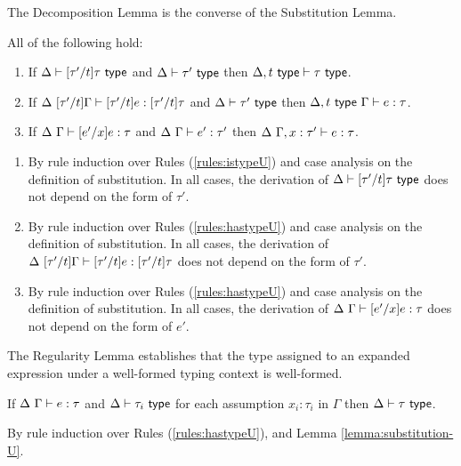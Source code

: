The Decomposition Lemma is the converse of the Substitution Lemma.
\begin{lemma}[Decomposition]\label{lemma:decomposition-U} All of the following hold:
\begin{enumerate}
\item If $\Delta \vdash [\tau'/t]\tau~\mathsf{type}$ and $\Delta \vdash \tau'~\mathsf{type}$ then $\Delta, t~\mathsf{type} \vdash \tau~\mathsf{type}$.
\item If $\Delta~[\tau'/t]\Gamma \vdash [\tau'/t]e : [\tau'/t]\tau$ and $\Delta \vdash \tau'~\mathsf{type}$ then $\Delta, t~\mathsf{type}~\Gamma \vdash e : \tau$.
\item If $\Delta~\Gamma \vdash [e'/x]e : \tau$ and $\Delta~\Gamma \vdash e' : \tau'$ then $\Delta~\Gamma, x : \tau' \vdash e : \tau$.
\end{enumerate}\end{lemma}
\begin{proof-sketch}
\begin{enumerate}
\item By rule induction over Rules (\ref{rules:istypeU}) and case analysis on the definition of substitution. In all cases, the derivation of $\Delta \vdash [\tau'/t]\tau~\mathsf{type}$ does not depend on the form of $\tau'$.
\item By rule induction over Rules (\ref{rules:hastypeU}) and case analysis on the definition of substitution. In all cases, the derivation of $\Delta~[\tau'/t]\Gamma \vdash [\tau'/t]e : [\tau'/t]\tau$ does not depend on the form of $\tau'$.
\item By rule induction over Rules (\ref{rules:hastypeU}) and case analysis on the definition of substitution. In all cases, the derivation of $\Delta~\Gamma \vdash [e'/x]e : \tau$ does not depend on the form of $e'$.
\end{enumerate}
\end{proof-sketch}

The Regularity Lemma establishes that the type assigned to an expanded expression under a well-formed typing context is well-formed. 
\begin{lemma}[Regularity]\label{lemma:regularity-U} If $\Delta~\Gamma \vdash e : \tau$ and $\Delta \vdash \tau_i~\mathsf{type}$ for each assumption $x_i : \tau_i$ in $\Gamma$ then $\Delta \vdash \tau~\mathsf{type}$.\end{lemma}
\begin{proof-sketch}
By rule induction over Rules (\ref{rules:hastypeU}), and Lemma \ref{lemma:substitution-U}.
\end{proof-sketch}
